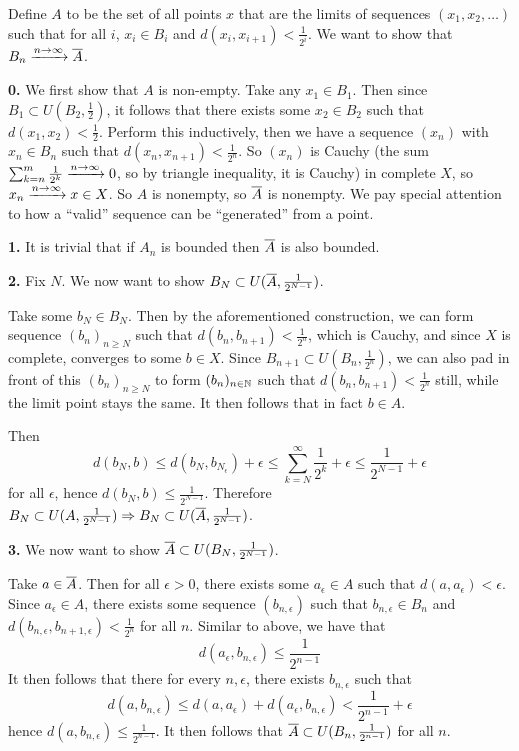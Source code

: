 \documentclass[a4paper, 10pt]{article}
\begin{document}
\begin{solution}
    Define $A$ to be the set of all points $x$ that are the limits of sequences $(x_1, x_2, \ldots)$ such that for all $i$, $x_i \in B_i$ and $d(x_i, x_{i+1}) < \frac{1}{2^i}$. We want to show that $B_n \xrightarrow{n \to \infty} \overline{A}$.

    \textbf{0.} We first show that $A$ is non-empty. Take any $x_1 \in B_1$. Then since $B_1 \subset U(B_2, \frac{1}{2})$, it follows that there exists some $x_2 \in B_2$ such that $d(x_1, x_2) < \frac{1}{2}$. Perform this inductively, then we have a sequence $(x_n)$ with $x_n \in B_n$ such that $d(x_n, x_{n+1}) < \frac{1}{2^n}$. So $(x_n)$ is Cauchy (the sum $\sum_{k = n}^{m} \frac{1}{2^k} \xrightarrow{n \to \infty} 0$, so by triangle inequality, it is Cauchy) in complete $X$, so $x_n \xrightarrow{n \to \infty} x \in X$. So $A$ is nonempty, so $\overline{A}$ is nonempty. We pay special attention to how a ``valid'' sequence can be ``generated'' from a point.
    
    \textbf{1.} It is trivial that if $A_n$ is bounded then $\overline{A}$ is also bounded.

    \textbf{2.} Fix $N$. We now want to show $B_N \subset U(\overline{A}, \frac{1}{2^{N-1}})$.
    
    Take some $b_N \in B_N$. Then by the aforementioned construction, we can form sequence $(b_n)_{n \geq N}$ such that $d(b_n, b_{n+1}) < \frac{1}{2^n}$, which is Cauchy, and since $X$ is complete, converges to some $b \in X$. Since $B_{n+1} \subset U(B_n, \frac{1}{2^n})$, we can also pad in front of this $(b_n)_{n \geq N}$ to form $(b_n)_{n \in \mathbb{N}}$ such that $d(b_n, b_{n+1}) < \frac{1}{2^n}$ still, while the limit point stays the same. It then follows that in fact $b \in A$.

    Then \begin{equation*}
    d(b_N, b) \leq d(b_N, b_{N_\epsilon}) + \epsilon \leq \sum_{k = N}^{\infty} \frac{1}{2^k} + \epsilon \leq \frac{1}{2^{N-1}} + \epsilon
    \end{equation*}
    for all $\epsilon$, hence $d(b_N, b) \leq \frac{1}{2^{N-1}}$. Therefore $B_N \subset U(A, \frac{1}{2^{N-1}}) \Rightarrow B_N \subset U(\overline{A}, \frac{1}{2^{N-1}})$.

    \textbf{3.} We now want to show $\overline{A} \subset U(B_N, \frac{1}{2^{N-1}})$.

    Take $a \in \overline{A}$. Then for all $\epsilon > 0$, there exists some $a_\epsilon \in A$ such that $d(a, a_\epsilon) < \epsilon$. Since $a_\epsilon \in A$, there exists some sequence $(b_{n, \epsilon})$ such that $b_{n, \epsilon} \in B_n$ and $d(b_{n, \epsilon}, b_{n+1, \epsilon}) < \frac{1}{2^n}$ for all $n$. Similar to above, we have that \begin{equation*}
    d(a_\epsilon, b_{n, \epsilon}) \leq \frac{1}{2^{n-1}} 
    \end{equation*}
    It then follows that there for every $n, \epsilon$, there exists $b_{n, \epsilon}$ such that \begin{equation*}
    d(a, b_{n, \epsilon}) \leq d(a, a_{\epsilon}) + d(a_\epsilon, b_{n, \epsilon}) < \frac{1}{2^{n-1}} + \epsilon
    \end{equation*}
    hence $d(a, b_{n, \epsilon}) \leq \frac{1}{2^{n-1}}$. It then follows that $\overline{A} \subset U(B_n, \frac{1}{2^{n-1}})$ for all $n$.


\end{solution}
\end{document}
